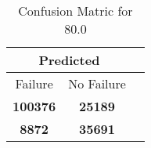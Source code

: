 \begin{table}[] 
\caption{Confusion Matric for 80.0} 
\label{Table: Prediction Accuracy-DMD80.0OnlySunEKF-resetReflection-Reflection} 
\centering 
\begin{tabular} 
 {@{}ccc@{}} 
\toprule 
\multicolumn{2}{c}{\textbf{Predicted}}
 \\ \midrule 
\multicolumn{1}{|c|}{Failure} & 
\multicolumn{1}{c|}{No Failure}
 \\ \midrule 
\multicolumn{1}{|c|}{\color{green}\textbf{100376}} & 
\multicolumn{1}{c|}{\color{red}\textbf{25189}}
 \\ \midrule 
\multicolumn{1}{|c|}{\color{red}\textbf{8872}} & 
\multicolumn{1}{c|}{\color{green}\textbf{35691}}
 \\ \bottomrule 
\end{tabular} 
\end{table} 
